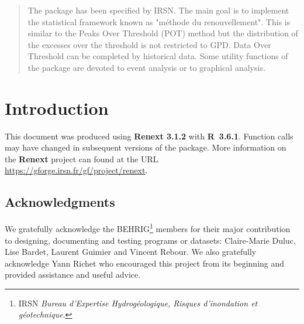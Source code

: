 \documentclass[a4paper]{report}
\newcommand\blankpage{%
    \null
    \thispagestyle{empty}%
    \addtocounter{page}{-1}%
    \newpage}
\newenvironment{Prov}
   {\medskip \par \noindent%
    \sf \color{blue} }%
  {\medskip \par}
\begin{document}
\begin{abstract}
  
  The \verb@Renext@ package has been specified by IRSN.  The main goal
  is to implement the statistical framework known as "m\'ethode du
  renouvellement".  This is similar to the Peaks Over Threshold (POT)
  method but the distribution of the excesses over the threshold is
  not restricted to GPD. Data Over Threshold can be completed by
  historical data.  Some utility functions of the package are devoted
  to event analysis or to graphical analysis.

\end{abstract}

\pagebreak

\setcounter{page}{1}

\chapter{Introduction}
\label{Chap-Intro}

\begin{Prov}
  This document was produced using  \textbf{Renext 3.1.2}
  with \textbf{R~3.6.1}. 
  Function calls may have changed in subsequent versions of the package.
  More information on the \textbf{Renext} project can found at the 
  URL \url{https://gforge.irsn.fr/gf/project/renext}.
\end{Prov}

\section*{Acknowledgments}
 
We gratefully acknowledge the BEHRIG\footnote{IRSN \textit{Bureau
    d'Expertise Hydrog\'eologique, Risques d'inondation et
    g\'eotechnique}.} members for their major contribution to
designing, documenting and testing programs or datasets: Claire-Marie
Duluc, Lise Bardet, Laurent Guimier and Vincent Rebour. We also
gratefully acknowledge Yann Richet who encouraged this project from
its beginning and provided assistance and useful advice.
\end{document}
